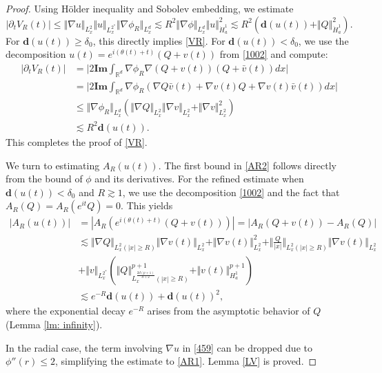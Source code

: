 \documentclass[12pt]{amsart}
\begin{document}
\begin{proof}
Using H\"{o}lder inequality and Sobolev embedding, we estimate
\begin{equation*}
|\partial _{t}V_{R}(t)|\leq \Vert \nabla u\Vert _{L_x^2}\Vert u\Vert _{L_x^{2^{\ast}}}\Vert \nabla \phi _{R}\Vert _{L_x^d}\lesssim R^{2}\Vert \nabla \phi \Vert _{L_x^d}\Vert u\Vert _{\dot{H}_{a}^{1}}^{2}\lesssim R^{2}(\mathbf{d}(u(t))+\Vert
Q\Vert _{\dot{H}_{a}^{1}}^{2}).
\end{equation*}%
For $\mathbf{d}(u(t))\geq \delta _{0}$, this directly implies \eqref{VR}. 
For $\mathbf{d}(u(t))<\delta _{0}$, we use the decomposition $u(t)=e^{i(\theta(t)+t)}(Q+v(t))$ from \eqref{1002} and compute:
\begin{align*}
|\partial _{t}V_{R}(t)|& =\bigl|2\mathbf{Im}\int_{\mathbb{R}^{d}}\nabla \phi
_{R}\nabla (Q+v(t))(Q+\bar{v}(t))dx\bigr| \\
& =\bigl|2\mathbf{Im}\int_{\mathbb{R}^{d}}\nabla \phi _{R}(\nabla Q\bar{v}%
(t)+\nabla v(t)Q+\nabla v(t)\bar{v}(t))dx\bigr| \\
& \leq \Vert \nabla \phi _{R}\Vert _{L_x^d}(\Vert \nabla Q\Vert _{L_x^2}\Vert \nabla
v\Vert _{L_x^2}+\Vert \nabla v\Vert _{L_x^2}^{2}) \\
& \lesssim R^{2}\mathbf{d}(u(t)).
\end{align*}
This completes the proof of \eqref{VR}. 

We turn to estimating $A_{R}(u(t))$. The first bound in \eqref{AR2} follows directly from the bound of $\phi$ and its derivatives. For the refined estimate when $\mathbf{d}(u(t))<\delta_0$ and $R\gtrsim 1$, we use the decomposition \eqref{1002} and the fact that $A_R(Q)=A_R(e^{it}Q)=0$. 
This yields
\begin{align*}
|A_{R}(u(t))|& =|A_{R}(e^{i(\theta (t)+t)}(Q+v(t)))|=|A_{R}(Q+v(t))-A_{R}(Q)|
\\
& \lesssim \Vert \nabla Q\Vert _{L_x^{2}(|x|\geq R)}\Vert \nabla v(t)\Vert _{L_x^2}+\Vert \nabla v(t)\Vert _{L_x^2}^{2}+\Vert \frac{Q}{|x|}\Vert
_{L_x^{2}(|x|\geq R)}\Vert \nabla v(t)\Vert _{L_x^2} \\
& +\Vert v\Vert _{L_x^{2^{\ast }}}(\Vert Q\Vert _{L_x^{\frac{2d(p+1)}{d+2}}(|x|\geq
R)}^{p+1}+\Vert v(t)\Vert _{H_{a}^{1}}^{p+1}) \\
& \lesssim e^{{ -R}}\mathbf{d}(u(t))+\mathbf{d}(u(t))^{2},
\end{align*}%
where the exponential decay $e^{-R}$ arises from the asymptotic behavior of $Q$ (Lemma \ref{lm: infinity}).

In the radial case, the term involving $\nabla u$ in \eqref{459} can be dropped due to $\phi''(r)\le 2$, simplifying the estimate to \eqref{AR1}. Lemma \ref{LV} is proved. 
\end{proof}
\end{document}
